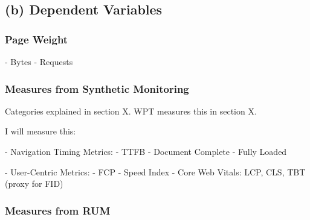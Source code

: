 






\subsection{(b) Dependent Variables}


\subsubsection{Page Weight}

	- Bytes
	- Requests

\subsubsection{Measures from Synthetic Monitoring}

Categories explained in section X.
WPT measures this in section X.

I will measure this:

- Navigation Timing Metrics:
	- TTFB
	- Document Complete
	- Fully Loaded
	
- User-Centric Metrics:
	- FCP
	- Speed Index
	- Core Web Vitals: LCP, CLS, TBT (proxy for FID)

\subsubsection{Measures from RUM}


